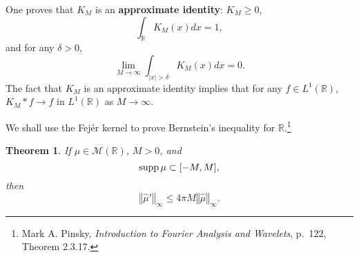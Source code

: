 \documentclass{article}
\newcommand{\supp}{\ensuremath\mathrm{supp}\,}
\newcommand{\norm}[1]{\left\Vert #1 \right\Vert}
\newtheorem{theorem}{Theorem}
\theoremstyle{definition}
\begin{document}
One proves that $K_M$ is an \textbf{approximate identity}:  $K_M \geq 0$, 
\[
\int_{\mathbb{R}} K_M(x) dx = 1,
\]
and for any $\delta>0$,
\[
\lim_{M \to \infty} \int_{|x|>\delta} K_M(x) dx =0.
\]
The fact that $K_M$ is an approximate identity implies that for any $f \in L^1(\mathbb{R})$,
$K_M*f \to f$ in $L^1(\mathbb{R})$ as $M \to \infty$. 


We shall use the Fej\'er kernel to prove Bernstein's inequality for $\mathbb{R}$.\footnote{Mark A. Pinsky,
{\em Introduction to Fourier Analysis and Wavelets}, p.~122, Theorem 2.3.17.}

\begin{theorem}
If $\mu \in \mathcal{M}(\mathbb{R})$, $M>0$, and
\[
\supp \mu \subset [-M,M],
\]
then
\[
\norm{\hat{\mu}'}_\infty \leq 4\pi M \norm{\hat{\mu}}_\infty.
\]
\end{theorem}
\end{document}
